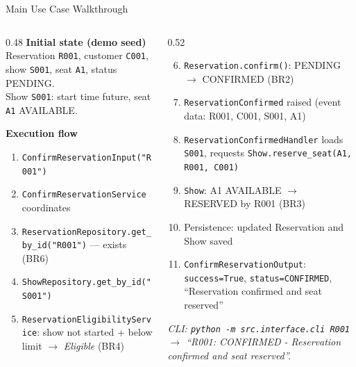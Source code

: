 \documentclass[aspectratio=169,11pt]{beamer}
\newcommand{\code}[1]{\texttt{#1}}
\begin{document}
\begin{frame}{Main Use Case Walkthrough}
  \begin{columns}[t]
    \begin{column}{0.48\textwidth}
      \scriptsize
      \textbf{Initial state (demo seed)}\\
      Reservation \code{R001}, customer \code{C001}, show \code{S001},
      seat \code{A1}, status PENDING.\\
      Show \code{S001}: start time future, seat \code{A1} AVAILABLE.
      \vspace{0.12cm}

      \textbf{Execution flow}
      \begin{enumerate}
        \item \code{ConfirmReservationInput("R001")}
        \item \code{ConfirmReservationService} coordinates
        \item \code{ReservationRepository.get\_by\_id("R001")} --- exists (BR6)
        \item \code{ShowRepository.get\_by\_id("S001")}
        \item \code{ReservationEligibilityService}: show not started + below
              limit $\rightarrow$ \emph{Eligible} (BR4)
      \end{enumerate}
    \end{column}
    \begin{column}{0.52\textwidth}
      \scriptsize
      \begin{enumerate}\setcounter{enumi}{5}
        \item \code{Reservation.confirm()}: PENDING $\rightarrow$ CONFIRMED (BR2)
        \item \code{ReservationConfirmed} raised (event data: R001, C001,
              S001, A1)
        \item \code{ReservationConfirmedHandler} loads \code{S001}, requests
              \code{Show.reserve\_seat(A1, R001, C001)}
        \item \code{Show}: A1 AVAILABLE $\rightarrow$ RESERVED by R001 (BR3)
        \item Persistence: updated Reservation and Show saved
        \item \code{ConfirmReservationOutput}: \code{success=True},
              \code{status=CONFIRMED}, ``Reservation confirmed and seat
              reserved''
      \end{enumerate}
      \vspace{0.1cm}
      {\scriptsize\itshape CLI: \code{python -m src.interface.cli R001}
      $\rightarrow$ ``R001: CONFIRMED - Reservation confirmed and seat reserved''.}
    \end{column}
  \end{columns}
\end{frame}
\end{document}
